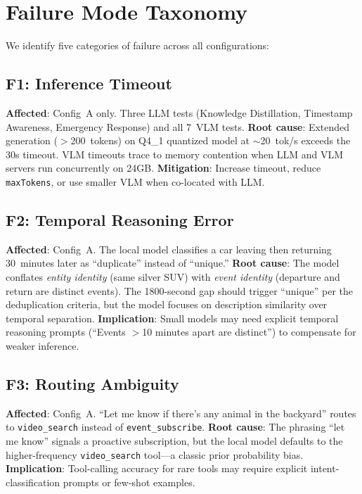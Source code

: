 \documentclass[conference]{IEEEtran}
\begin{document}

\section{Failure Mode Taxonomy}

We identify five categories of failure across all configurations:

\subsection{F1: Inference Timeout}
\textbf{Affected}: Config~A only. Three LLM tests (Knowledge Distillation,
Timestamp Awareness, Emergency Response) and all 7~VLM tests.
\textbf{Root cause}: Extended generation ($>$200~tokens) on Q4\_1 quantized
model at $\sim$20~tok/s exceeds the 30s timeout. VLM timeouts trace to
memory contention when LLM and VLM servers run concurrently on 24GB.
\textbf{Mitigation}: Increase timeout, reduce \texttt{maxTokens}, or use
smaller VLM when co-located with LLM.

\subsection{F2: Temporal Reasoning Error}
\textbf{Affected}: Config~A. The local model classifies a car leaving
then returning 30~minutes later as ``duplicate'' instead of ``unique.''
\textbf{Root cause}: The model conflates \emph{entity identity} (same
silver SUV) with \emph{event identity} (departure and return are distinct
events). The 1800-second gap should trigger ``unique'' per the deduplication
criteria, but the model focuses on description similarity over temporal
separation.
\textbf{Implication}: Small models may need explicit temporal reasoning
prompts (``Events $>$10 minutes apart are distinct'') to compensate for
weaker inference.

\subsection{F3: Routing Ambiguity}
\textbf{Affected}: Config~A. ``Let me know if there's any animal in the
backyard'' routes to \texttt{video\_search} instead of
\texttt{event\_subscribe}.
\textbf{Root cause}: The phrasing ``let me know'' signals a proactive
subscription, but the local model defaults to the higher-frequency
\texttt{video\_search} tool---a classic prior probability bias.
\textbf{Implication}: Tool-calling accuracy for rare tools may require
explicit intent-classification prompts or few-shot examples.
\end{document}
